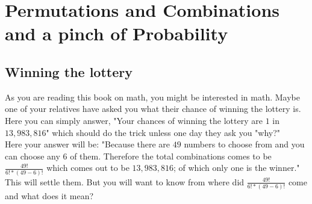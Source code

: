 \chapter{Permutations and Combinations and a pinch of Probability}
\section{Winning the lottery}
As you are reading this book on math, you might be interested in math. Maybe one of your relatives have asked you what their chance of winning the lottery is. Here you can simply answer, "Your chances of winning the lottery are $1$ in $13,983,816$" which should do the trick unless one day they ask you "why?"\\
Here your answer will be: "Because there are $49$ numbers to choose from and you can choose any $6$ of them. Therefore the total combinations comes to be $\frac{49!}{6!*(49-6)!}$ which comes out to be $13,983,816$; of which only one is the winner." \\
This will settle them. But you will want to know from where did $\frac{49!}{6!*(49-6)!}$ come and what does it mean?\\
